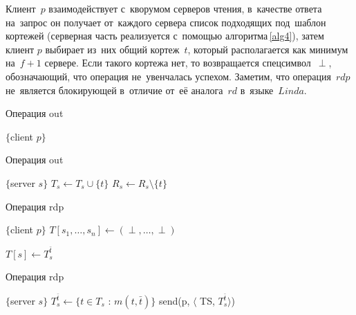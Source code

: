 Клиент~$p$ взаимодействует с~кворумом серверов чтения, в~качестве ответа на~запрос он получает от~каждого сервера список подходящих под~шаблон кортежей (серверная часть реализуется с~помощью алгоритма\,\ref{alg4}), затем клиент $p$ выбирает из~них общий кортеж~$t$, который располагается как минимум на~$f + 1$ сервере. Если такого кортежа нет, то возвращается спецсимвол~$\perp$, обозначающий, что операция не~увенчалась успехом. Заметим, что операция~$rdp$ не~является блокирующей в~отличие от~её аналога~$rd$ в~языке~$Linda$.

\begin{algorithm}[H]
	\caption{Операция out}\label{alg1}
	\begin{algorithmic}[1]
		\Statex $\{$client $p \}$
		\State {}
		\EndFor
		\EndProcedure
	\end{algorithmic}
\end{algorithm}

\begin{algorithm}[H]
	\caption{Операция out}\label{alg2}
	\begin{algorithmic}[1]
		\Statex $\{$server $s \}$
		\State $T_s \gets T_s \cup \{t\}$
		\EndIf
		\State $R_s \gets R_s \setminus \{t\}$
		\EndUpon
	\end{algorithmic}
\end{algorithm}

\begin{algorithm}[H]
	\caption{Операция rdp}\label{alg3}
	\begin{algorithmic}[1]
		\Statex $\{$client $p \}$
		\State $T[s_1, \dots, s_n] \gets (\perp, \dots, \perp)$
		
		\State {}
		\EndFor
		
		\Repeat
		\State {}
		\State $T[s] \gets T_s^{\bar t}$
		
		\State {}
		\EndIf
		\State \Return{$\perp$}
		\EndFunction
	\end{algorithmic}
\end{algorithm}

\begin{algorithm}[H]
	\caption{Операция rdp}\label{alg4}
	\begin{algorithmic}[1]
		\Statex $\{$server $s \}$
		\State $T_s^{\bar t} \gets \{t \in T_s$ : $m(t, \bar t)\}$
		\State send(p, $\langle$ TS, $T_s^{\bar t}\rangle$)
		\EndUpon
	\end{algorithmic}
\end{algorithm}


